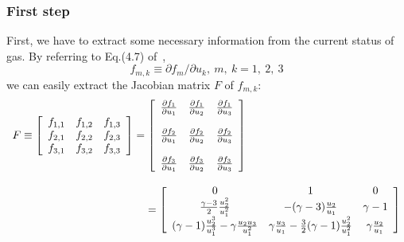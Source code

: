 \documentclass[a4paper,12pt,dvips]{article}
\begin{document}
\subsubsection{First step}
 \label{subsubsec:first_step}
First, we have to extract some necessary information from the current status 
of gas. By referring to Eq.(4.7) of~\cite{CESE_Shin_Chung_Chang_1995}, 
\begin{equation}
f_{m,k}\equiv\partial f_{m}/\partial u_{k},~m,~k = 1,~2,~3
\end{equation}
we can easily extract the Jacobian matrix $F$ of $f_{m,k}$:
\begin{equation}
\begin{array}{l}
F\equiv\left[
       \begin{array}{ccc}
       f_{1,1} & f_{1,2} & f_{1,3} \\
       f_{2,1} & f_{2,2} & f_{2,3} \\
       f_{3,1} & f_{3,2} & f_{3,3}
       \end{array}
       \right] 
       =
       \left[
       \begin{array}{ccc}
       \frac{\partial f_{1}}{\partial u_{1}} & \frac{\partial f_{1}}{\partial 
       u_{2}} & \frac{\partial f_{1}}{\partial u_{3}} \\ \\
       \frac{\partial f_{2}}{\partial u_{1}} & \frac{\partial f_{2}}{\partial 
       u_{2}} & \frac{\partial f_{2}}{\partial u_{3}} \\ \\
       \frac{\partial f_{3}}{\partial u_{1}} & \frac{\partial f_{3}}{\partial 
       u_{2}} & \frac{\partial f_{3}}{\partial u_{3}}
       \end{array}
       \right] \\ \\
       \hspace{44mm}=
       \left[
       \begin{array}{ccc}
       0 & 1 & 0 \\
       \frac{\gamma -3}{2}\frac{u^{2}_{2}}{u^{2}_{1}} & -(\gamma -3)\frac{u_{2}}
       {u_{1}} & \gamma -1 \\
       (\gamma -1)\frac{u^{3}_{2}}{u^{3}_{1}}-\gamma\frac{u_{2}u_{3}}{u^{2}_{1}} 
       & \gamma\frac{u_{3}}{u_{1}}-\frac{3}{2}(\gamma -1)\frac{u^{2}_{2}}{u^{2}_{1}} 
       & \gamma\frac{u_{2}}{u_{1}}
       \end{array}
       \right]
\end{array}
\end{equation}
\end{document}
